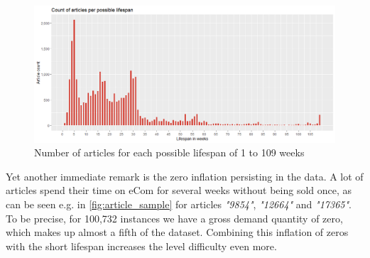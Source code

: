 \begin{figure}[H]
\centering
  \includegraphics[width=0.95\linewidth]{figures/article_lifespan.png}
  \caption{Number of articles for each possible lifespan of 1 to 109 weeks}
  \label{fig:article_lifespan}
\end{figure}



Yet another immediate remark is the zero inflation persisting in the data. A lot of articles spend their time on eCom for several weeks without being sold once, as can be seen e.g. in \autoref{fig:article_sample} for articles \textit{"9854"}, \textit{"12664"} and \textit{"17365"}. To be precise, for 100,732 instances we have a gross demand quantity of zero, which makes up almost a fifth of the dataset. Combining this inflation of zeros with the short lifespan increases the level difficulty even more.







